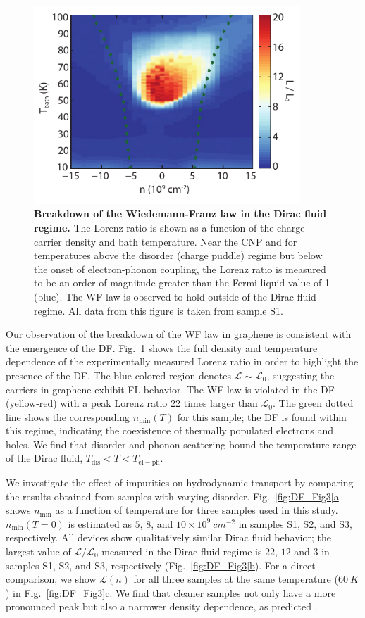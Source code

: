 \begin{figure}
\centering
\includegraphics[width=100mm]{figures/Dirac_fluid/Fig2.pdf}
\caption{\textbf{Breakdown of the Wiedemann-Franz law in the Dirac fluid regime.} The Lorenz ratio is shown as a function of the charge carrier density and bath temperature. Near the CNP and for temperatures above the disorder (charge puddle) regime but below the onset of electron-phonon coupling, the Lorenz ratio is measured to be an order of magnitude greater than the Fermi liquid value of 1 (blue). The WF law is observed to hold outside of the Dirac fluid regime.  All data from this figure is taken from sample S1.}
\label{fig:DF_Fig2}
\end{figure}

Our observation of the breakdown of the WF law in graphene is consistent with the emergence of the DF. Fig.~\ref{fig:DF_Fig2} shows the full density and temperature dependence of the experimentally measured Lorenz ratio in order to highlight the presence of the DF. The blue colored region denotes $\mathcal{L}\sim\mathcal{L}_0$, suggesting the carriers in graphene exhibit FL behavior. The WF law is violated in the DF (yellow-red) with a peak Lorenz ratio 22 times larger than $\mathcal{L}_0$. The green dotted line shows the corresponding $n_{\mathrm{min}}(T)$ for this sample; the DF is found within this regime, indicating the coexistence of thermally populated electrons and holes. We find that disorder and phonon scattering bound the temperature range of the Dirac fluid, $T_{\mathrm{dis}}<T<T_{\mathrm{el-ph}}$.

We investigate the effect of impurities on hydrodynamic transport by comparing the results obtained from samples with varying disorder. Fig.~\hyperref[fig:DF_Fig3]{\ref*{fig:DF_Fig3}a} shows $n_{\mathrm{min}}$ as a function of temperature for three samples used in this study. $n_{\mathrm{min}}(T=0)$ is estimated as $5$, $8$, and $10\times 10^9~cm^{-2}$ in samples S1, S2, and S3, respectively. All devices show qualitatively similar Dirac fluid behavior; the largest value of $\mathcal{L}/\mathcal{L}_0$ measured in the Dirac fluid regime is $22$, $12$ and $3$ in samples S1, S2, and S3, respectively (Fig.~\hyperref[fig:DF_Fig3]{\ref*{fig:DF_Fig3}b}). For a direct comparison, we show $\mathcal{L}(n)$ for all three samples at the same temperature ($60~K$) in Fig.~\hyperref[fig:DF_Fig3]{\ref*{fig:DF_Fig3}c}. We find that cleaner samples not only have a more pronounced peak but also a narrower density dependence, as predicted \cite{muller_quantum-critical_2008, foster_slow_2009}.

